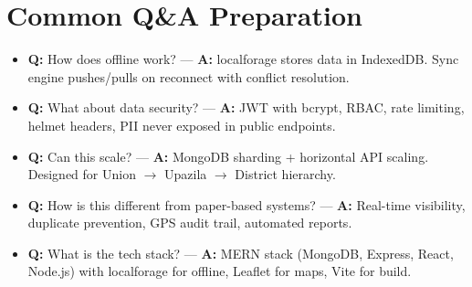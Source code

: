 \section{Common Q\&A Preparation}
\begin{itemize}[nosep]
    \item \textbf{Q:} How does offline work? --- \textbf{A:} localforage stores data in IndexedDB. Sync engine pushes/pulls on reconnect with conflict resolution.
    \item \textbf{Q:} What about data security? --- \textbf{A:} JWT with bcrypt, RBAC, rate limiting, helmet headers, PII never exposed in public endpoints.
    \item \textbf{Q:} Can this scale? --- \textbf{A:} MongoDB sharding + horizontal API scaling. Designed for Union $\rightarrow$ Upazila $\rightarrow$ District hierarchy.
    \item \textbf{Q:} How is this different from paper-based systems? --- \textbf{A:} Real-time visibility, duplicate prevention, GPS audit trail, automated reports.
    \item \textbf{Q:} What is the tech stack? --- \textbf{A:} MERN stack (MongoDB, Express, React, Node.js) with localforage for offline, Leaflet for maps, Vite for build.
\end{itemize}
